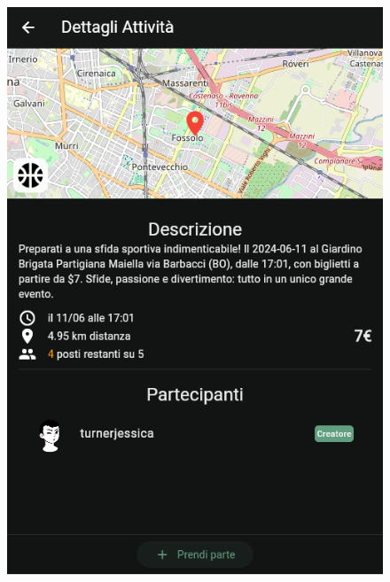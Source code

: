 \documentclass[a4paper,12pt]{article}
\begin{document}
\begin{figure}[H]
    \centering
    \begin{minipage}{0.32\textwidth}
        \centering
        \includegraphics[width=1\linewidth]{img/descrizione.png}
    \end{minipage}
    \begin{minipage}{0.32\textwidth}
        \centering

\end{minipage}
\end{figure}
\end{document}
